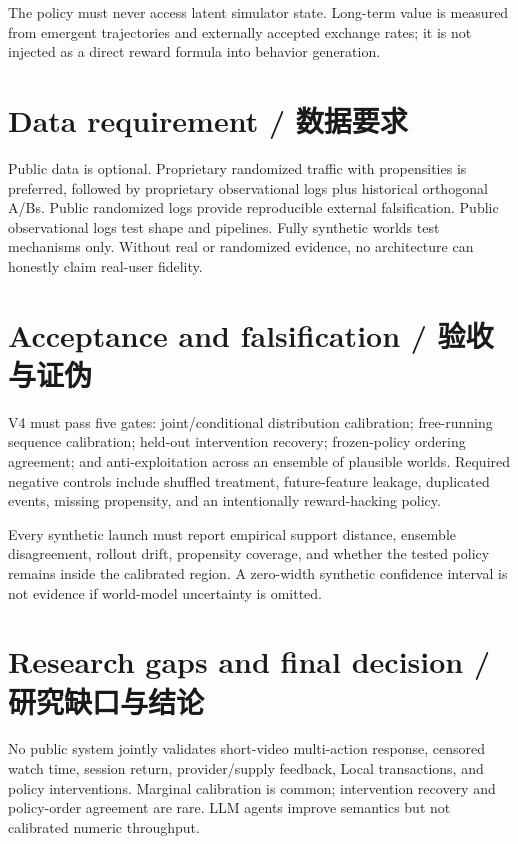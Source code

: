 \documentclass[10.5pt,a4paper]{article}
\begin{document}
The policy must never access latent simulator state. Long-term value is measured from emergent trajectories and externally accepted exchange rates; it is not injected as a direct reward formula into behavior generation.

\section{Data requirement / 数据要求}

Public data is optional. Proprietary randomized traffic with propensities is preferred, followed by proprietary observational logs plus historical orthogonal A/Bs. Public randomized logs provide reproducible external falsification. Public observational logs test shape and pipelines. Fully synthetic worlds test mechanisms only. Without real or randomized evidence, no architecture can honestly claim real-user fidelity.

\section{Acceptance and falsification / 验收与证伪}

V4 must pass five gates: joint/conditional distribution calibration; free-running sequence calibration; held-out intervention recovery; frozen-policy ordering agreement; and anti-exploitation across an ensemble of plausible worlds. Required negative controls include shuffled treatment, future-feature leakage, duplicated events, missing propensity, and an intentionally reward-hacking policy.

Every synthetic launch must report empirical support distance, ensemble disagreement, rollout drift, propensity coverage, and whether the tested policy remains inside the calibrated region. A zero-width synthetic confidence interval is not evidence if world-model uncertainty is omitted.

\section{Research gaps and final decision / 研究缺口与结论}

No public system jointly validates short-video multi-action response, censored watch time, session return, provider/supply feedback, Local transactions, and policy interventions. Marginal calibration is common; intervention recovery and policy-order agreement are rare. LLM agents improve semantics but not calibrated numeric throughput.
\end{document}
